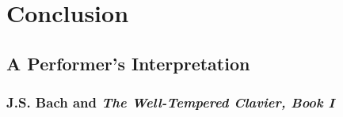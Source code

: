 \chapter*{Conclusion}\label{conclusion}

\section*{A Performer's Interpretation}

\subsection*{J.S. Bach and \textit{The Well-Tempered Clavier, Book I}}